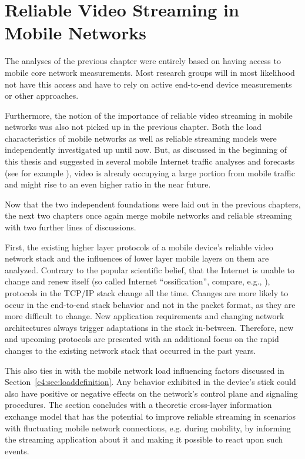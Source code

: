 \chapter{Reliable Video Streaming in Mobile Networks}
\label{chap:mobilestreaming}

The analyses of the previous chapter were entirely based on having access to mobile core network measurements. Most research groups will in most likelihood not have this access and have to rely on active end-to-end device measurements or other approaches.

Furthermore, the notion of the importance of reliable video streaming in mobile networks was also not picked up in the previous chapter. Both the load characteristics of mobile networks as well as reliable streaming models were independently investigated up until now. But, as discussed in the beginning of this thesis and suggested in several mobile Internet traffic analyses and forecasts (see for example \cite{cisco2014VNI}), video is already occupying a large portion from mobile traffic and might rise to an even higher ratio in the near future.

Now that the two independent foundations were laid out in the previous chapters, the next two chapters once again merge mobile networks and reliable streaming with two further lines of discussions. 

First, the existing higher layer protocols of a mobile device's reliable video network stack and the influences of lower layer mobile layers on them are analyzed. Contrary to the popular scientific belief, that the Internet is unable to change and renew itself (so called Internet ``ossification'', compare, e.g., \cite{feldmann2010ossification}), protocols in the \gls{TCP}/\gls{IP} stack change all the time. Changes are more likely to occur in the end-to-end stack behavior and not in the packet format, as they are more difficult to change. New application requirements and changing network architectures always trigger adaptations in the stack in-between. Therefore, new and upcoming protocols are presented with an additional focus on the rapid changes to the existing network stack that occurred in the past years.

This also ties in with the mobile network load influencing factors discussed in Section~\ref{c4:sec:loaddefinition}. Any behavior exhibited in the device's stick could also have positive or negative effects on the network's control plane and signaling procedures. The section concludes with a theoretic cross-layer information exchange model that has the potential to improve reliable streaming in scenarios with fluctuating mobile network connections, e.g. during mobility, by informing the streaming application about it and making it possible to react upon such events.

